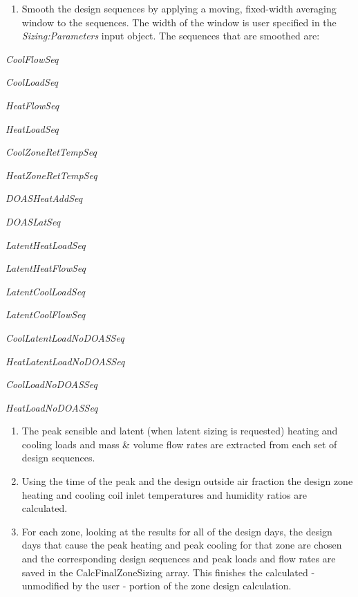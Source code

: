 \begin{enumerate}
\def\labelenumi{(\arabic{enumi})}
\tightlist
\item
  Smooth the design sequences by applying a moving, fixed-width averaging window to the sequences. The width of the window is user specified in the \emph{Sizing:Parameters} input object. The sequences that are smoothed are:
\end{enumerate}

\begin{enumerate}
\def\labelenumi{(\alph{enumi})}
{\setlength\itemindent{25pt} \item \emph{CoolFlowSeq} }
{\setlength\itemindent{25pt} \item \emph{CoolLoadSeq} }
{\setlength\itemindent{25pt} \item \emph{HeatFlowSeq} }
{\setlength\itemindent{25pt} \item \emph{HeatLoadSeq} }
{\setlength\itemindent{25pt} \item \emph{CoolZoneRetTempSeq} }
{\setlength\itemindent{25pt} \item \emph{HeatZoneRetTempSeq} }
{\setlength\itemindent{25pt} \item \emph{DOASHeatAddSeq} }
{\setlength\itemindent{25pt} \item \emph{DOASLatSeq} }
{\setlength\itemindent{25pt} \item \emph{LatentHeatLoadSeq} }
{\setlength\itemindent{25pt} \item \emph{LatentHeatFlowSeq} }
{\setlength\itemindent{25pt} \item \emph{LatentCoolLoadSeq} }
{\setlength\itemindent{25pt} \item \emph{LatentCoolFlowSeq} }
{\setlength\itemindent{25pt} \item \emph{CoolLatentLoadNoDOASSeq} }
{\setlength\itemindent{25pt} \item \emph{HeatLatentLoadNoDOASSeq} }
{\setlength\itemindent{25pt} \item \emph{CoolLoadNoDOASSeq} }
{\setlength\itemindent{25pt} \item \emph{HeatLoadNoDOASSeq} }
\end{enumerate}

\begin{enumerate}
\def\labelenumi{(\arabic{enumi})}
\setcounter{enumi}{1}
\item
  The peak sensible and latent (when latent sizing is requested) heating and cooling loads and mass \& volume flow rates are extracted from each set of design sequences.
\item
  Using the time of the peak and the design outside air fraction the design zone heating and cooling coil inlet temperatures and humidity ratios are calculated.
\item
  For each zone, looking at the results for all of the design days, the design days that cause the peak heating and peak cooling for that zone are chosen and the corresponding design sequences and peak loads and flow rates are saved in the CalcFinalZoneSizing array. This finishes the calculated - unmodified by the user - portion of the zone design calculation.
\end{enumerate}


